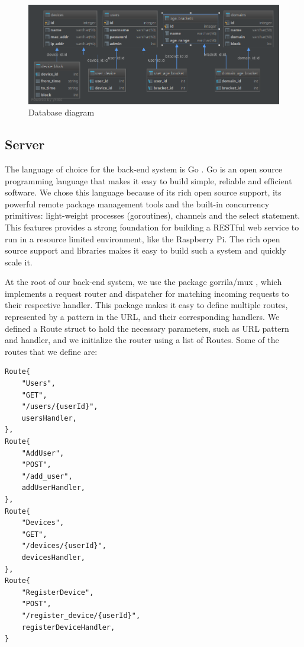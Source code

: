 \begin{figure}[th]
\centering
\includegraphics[width=1\textwidth]{Figures/database-diagram}
\decoRule
\caption{Database diagram}
\label{fig:database-diagram}
\end{figure}

\subsection{Server}

The language of choice for the back-end system is Go \citep{golang}. Go is an open source programming language that makes it easy to build simple, reliable and efficient software. We chose this language because of its rich open source support, its powerful remote package management tools and the built-in concurrency primitives: light-weight processes (goroutines), channels and the select statement. This features provides a strong foundation for building a RESTful web service to run in a resource limited environment, like the Raspberry Pi. The rich open source support and libraries makes it easy to build such a system and quickly scale it.

At the root of our back-end system, we use the package gorrila/mux \citep{gorillaMux}, which implements a request router and dispatcher for matching incoming requests to their respective handler. This package makes it easy to define multiple routes, represented by a pattern in the URL, and their corresponding handlers. We defined a Route struct to hold the necessary parameters, such as URL pattern and handler, and we initialize the router using a list of Routes. Some of the routes that we define are:

\begin{lstlisting}[language=Golang]
Route{
	"Users",
	"GET",
	"/users/{userId}",
	usersHandler,
},
Route{
	"AddUser",
	"POST",
	"/add_user",
	addUserHandler,
},
Route{
	"Devices",
	"GET",
	"/devices/{userId}",
	devicesHandler,
},
Route{
	"RegisterDevice",
	"POST",
	"/register_device/{userId}",
	registerDeviceHandler,
}
\end{lstlisting}

